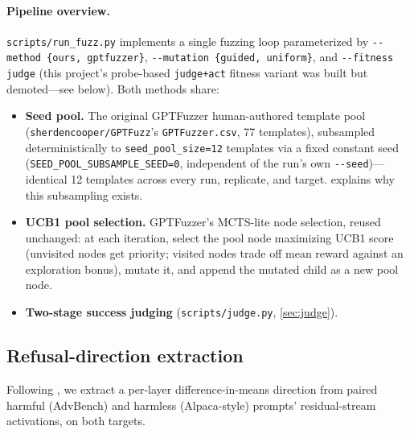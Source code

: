 \documentclass[11pt,letterpaper]{article}
\begin{document}
\paragraph{Pipeline overview.}
\texttt{scripts/run\_fuzz.py} implements a single fuzzing loop parameterized by
\texttt{-{}-method \{ours, gptfuzzer\}}, \texttt{-{}-mutation \{guided, uniform\}}, and
\texttt{-{}-fitness judge} (this project's probe-based \texttt{judge+act} fitness variant was
built but demoted---see below). Both methods share:
\begin{itemize}
  \item \textbf{Seed pool.} The original GPTFuzzer human-authored template pool
    (\texttt{sherdencooper/GPTFuzz}'s \texttt{GPTFuzzer.csv}, 77 templates), subsampled
    deterministically to \texttt{seed\_pool\_size=12} templates via a fixed constant seed
    (\texttt{SEED\_POOL\_SUBSAMPLE\_SEED=0}, independent of the run's own \texttt{-{}-seed})---identical
    12 templates across every run, replicate, and target.  explains why this
    subsampling exists.
  \item \textbf{UCB1 pool selection.} GPTFuzzer's MCTS-lite node selection, reused unchanged: at
    each iteration, select the pool node maximizing UCB1 score (unvisited nodes get priority;
    visited nodes trade off mean reward against an exploration bonus), mutate it, and append the
    mutated child as a new pool node.
  \item \textbf{Two-stage success judging} (\texttt{scripts/judge.py}, \cref{sec:judge}).
\end{itemize}

\subsection{Refusal-direction extraction}
\label{sec:direction}

Following \citet{arditi2024refusal}, we extract a per-layer difference-in-means direction from
paired harmful (AdvBench) and harmless (Alpaca-style) prompts' residual-stream activations, on
both targets.
\end{document}
